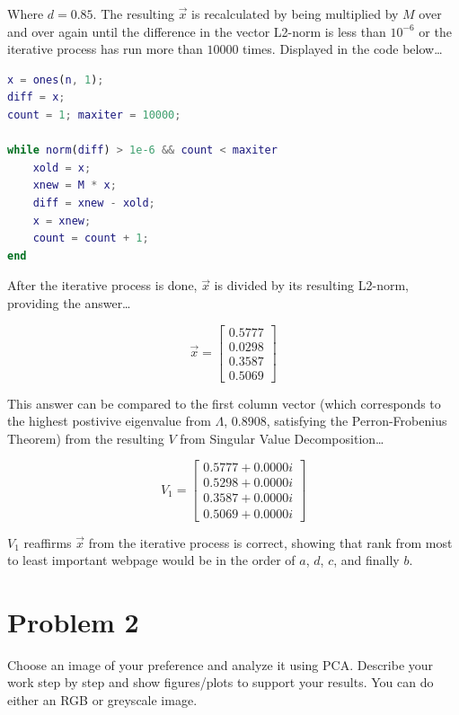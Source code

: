 \documentclass[12pt,letterpaper]{article}
\begin{document}
Where $d=0.85$. The resulting $\overrightarrow{x}$ is recalculated by being multiplied by $M$ over and over again until the difference in the vector L2-norm is less than $10^{-6}$ or the iterative process has run more than $10000$ times.
Displayed in the code below\ldots


\begin{lstlisting}[language = Matlab]
x = ones(n, 1);
diff = x;
count = 1; maxiter = 10000;

while norm(diff) > 1e-6 && count < maxiter
    xold = x;
    xnew = M * x;
    diff = xnew - xold;
    x = xnew;
    count = count + 1;
end
\end{lstlisting}

After the iterative process is done, $\overrightarrow{x}$ is divided by its resulting L2-norm, providing the answer\ldots

\begin{equation*}
    \overrightarrow{x} =
    \begin{bmatrix}
        0.5777 \\ 0.0298 \\ 0.3587 \\ 0.5069
    \end{bmatrix}
\end{equation*}

This answer can be compared to the first column vector (which corresponds to the highest postivive eigenvalue from $\Lambda$, $0.8908$, satisfying the Perron-Frobenius Theorem) from the resulting $V$ from Singular Value Decomposition\ldots

\begin{equation*}
    V_{1} =
    \begin{bmatrix}
        0.5777 + 0.0000i \\ 0.5298 + 0.0000i \\ 0.3587 + 0.0000i \\ 0.5069 + 0.0000i
    \end{bmatrix}
\end{equation*}

$V_1$ reaffirms $\overrightarrow{x}$ from the iterative process is correct, showing that rank from most to least important webpage would be in the order of $a$, $d$, $c$, and finally $b$.



\newpage
\section*{Problem 2}
Choose an image of your preference and analyze it using PCA. Describe your work step by step and show figures/plots to support your results. You can do either an RGB or greyscale image.
\end{document}
